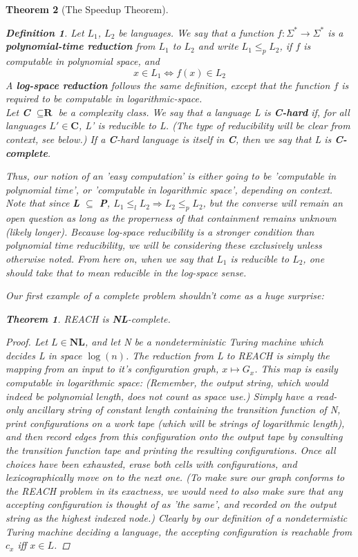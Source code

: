 \documentclass{article}
\theoremstyle{definition}
\newtheorem{definition}{Definition}[section]
\theoremstyle{plain}
\theoremstyle{theorem}
\newtheorem{theorem}{Theorem}[section]
\begin{document}
\begin{theorem}[The Speedup Theorem]
\begin{definition}
Let $L_1$, $L_2$ be languages. We say that a function $f:\Sigma^* \to \Sigma^*$ is a \textbf{polynomial-time reduction} from $L_1$ to $L_2$ and write $L_1 \leq_p L_2$, if $f$ is computable in polynomial space, and 
\[x \in L_1 \iff f(x) \in L_2 \]
A \textbf{log-space reduction} follows the same definition, except that the function $f$ is required to be computable in logarithmic-space. \\
Let \textbf{C} $\subseteq \textbf{R}$ be a complexity class. We say that a language L is \textbf{C-hard} if, for all languages $L' \in \textbf{C}$, L' is reducible to L. (The type of reducibility will be clear from context, see below.) If a \textbf{C}-hard language is itself in \textbf{C}, then we say that L is \textbf{C-complete}.
\end{definition}
Thus, our notion of an 'easy computation' is either going to be 'computable in polynomial time', or 'computable in logarithmic space', depending on context. Note that since \textbf{L} $\subseteq$ \textbf{P}, $L_1 \leq_l L_2 \Rightarrow L_2 \leq_p L_2$, but the converse will remain an open question as long as the properness of that containment remains unknown (likely longer). Because log-space reducibility is a stronger condition than polynomial time reducibility, we will be considering these exclusively unless otherwise noted. From here on, when we say that $L_1$ is reducible to $L_2$, one should take that to mean reducible in the log-space sense.
\par Our first example of a complete problem shouldn't come as a huge surprise:
\begin{theorem}
REACH is \textbf{NL}-complete.
\end{theorem}
\begin{proof}
Let $L \in \textbf{NL}$, and let N be a nondeterministic Turing machine which decides L in space $\log(n)$. The reduction from L to REACH is simply the mapping from an input to it's configuration graph, $x \mapsto G_x$. This map is easily computable in logarithmic space: (Remember, the output string, which would indeed be polynomial length, does not count as space use.) Simply have a read-only ancillary string of constant length containing the transition function of N, print configurations on a work tape (which will be strings of logarithmic length), and then record edges from this configuration onto the output tape by consulting the transition function tape and printing the resulting configurations. Once all choices have been exhausted, erase both cells with configurations, and lexicographically move on to the next one. (To make sure our graph conforms to the REACH problem in its exactness, we would need to also make sure that any accepting configuration is thought of as 'the same', and recorded on the output string as the highest indexed node.) Clearly by our definition of a nondetermistic Turing machine deciding a language, the accepting configuration is reachable from $c_x$ iff $x \in L$.

\end{proof}
\end{theorem}
\end{document}
